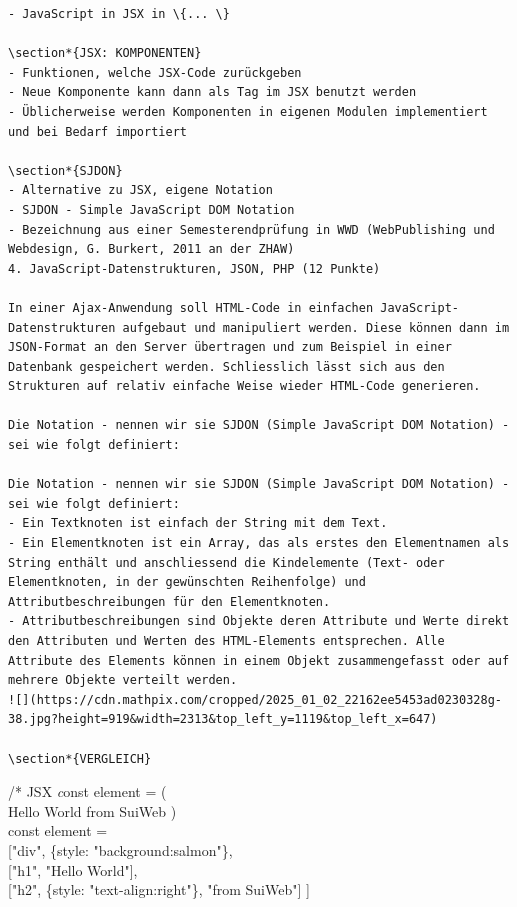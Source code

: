 \begin{verbatim}
- JavaScript in JSX in \{... \}

\section*{JSX: KOMPONENTEN}
- Funktionen, welche JSX-Code zurückgeben
- Neue Komponente kann dann als Tag im JSX benutzt werden
- Üblicherweise werden Komponenten in eigenen Modulen implementiert und bei Bedarf importiert

\section*{SJDON}
- Alternative zu JSX, eigene Notation
- SJDON - Simple JavaScript DOM Notation
- Bezeichnung aus einer Semesterendprüfung in WWD (WebPublishing und Webdesign, G. Burkert, 2011 an der ZHAW)
4. JavaScript-Datenstrukturen, JSON, PHP (12 Punkte)

In einer Ajax-Anwendung soll HTML-Code in einfachen JavaScript-Datenstrukturen aufgebaut und manipuliert werden. Diese können dann im JSON-Format an den Server übertragen und zum Beispiel in einer Datenbank gespeichert werden. Schliesslich lässt sich aus den Strukturen auf relativ einfache Weise wieder HTML-Code generieren.

Die Notation - nennen wir sie SJDON (Simple JavaScript DOM Notation) - sei wie folgt definiert:

Die Notation - nennen wir sie SJDON (Simple JavaScript DOM Notation) - sei wie folgt definiert:
- Ein Textknoten ist einfach der String mit dem Text.
- Ein Elementknoten ist ein Array, das als erstes den Elementnamen als String enthält und anschliessend die Kindelemente (Text- oder Elementknoten, in der gewünschten Reihenfolge) und Attributbeschreibungen für den Elementknoten.
- Attributbeschreibungen sind Objekte deren Attribute und Werte direkt den Attributen und Werten des HTML-Elements entsprechen. Alle Attribute des Elements können in einem Objekt zusammengefasst oder auf mehrere Objekte verteilt werden.
![](https://cdn.mathpix.com/cropped/2025_01_02_22162ee5453ad0230328g-38.jpg?height=919&width=2313&top_left_y=1119&top_left_x=647)

\section*{VERGLEICH}
\end{verbatim}

/* JSX \textit
const element = (\\
Hello World
from SuiWeb
)\\
const element =\\[0pt]
["div", \{style: "background:salmon"\},\\[0pt]
["h1", "Hello World"],\\[0pt]
["h2", \{style: "text-align:right"\}, "from SuiWeb"] ]

